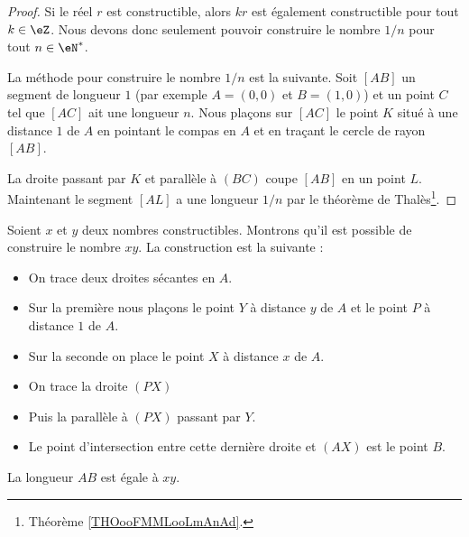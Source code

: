\begin{proof}
	Si le réel \( r\) est constructible, alors \( kr\) est également constructible pour tout \( k\in \eZ\). Nous devons donc seulement pouvoir construire le nombre \( 1/n\) pour tout \( n\in \eN^*\).

	\begin{center}
		
	\end{center}

	La méthode pour construire le nombre \( 1/n\) est la suivante. Soit \( [AB]\) un segment de longueur \( 1\) (par exemple \( A=(0,0)\) et \( B=(1,0)\)) et un point \( C\) tel que \( [AC]\) ait une longueur \( n\). Nous plaçons sur \( [AC]\) le point \( K\) situé à une distance \( 1\) de \( A\) en pointant le compas en \( A\) et en traçant le cercle de rayon \( [AB]\).

	La droite passant par \( K\) et parallèle à \( (BC)\) coupe \( [AB]\) en un point \( L\). Maintenant le segment \( [AL]\) a une longueur \( 1/n\) par le théorème de Thalès\footnote{Théorème \ref{THOooFMMLooLmAnAd}.}.
\end{proof}

\begin{example}    \label{ExGROooIosiBt}
	Soient \( x\) et \( y\) deux nombres constructibles. Montrons qu'il est possible de construire le nombre \( xy\). La construction est la suivante :

	\begin{center}
		
	\end{center}

	\begin{itemize}
		\item On trace deux droites sécantes en \( A\).
		\item Sur la première nous plaçons le point \( Y\) à distance \( y\) de \( A\) et le point \( P\) à distance \( 1\) de \( A\).
		\item Sur la seconde on place le point \( X\) à distance \( x\) de \( A\).
		\item On trace la droite \( (PX)\)
		\item Puis la parallèle à \( (PX)\) passant par \( Y\).
		\item Le point d'intersection entre cette dernière droite et \( (AX)\) est le point \( B\).
	\end{itemize}
	La longueur \( AB\) est égale à \( xy\).
\end{example}

